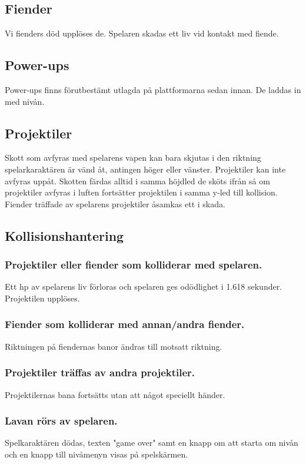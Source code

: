 \documentclass{TDP005mall}
\begin{document}
\subsection{Fiender}
Vi fienders död upplöses de. Spelaren skadas ett liv vid kontakt med fiende.

\subsection{Power-ups}
Power-ups finns förutbestämt utlagda på plattformarna sedan innan. De laddas in med nivån.

\subsection{Projektiler}
Skott som avfyras med spelarens vapen kan bara skjutas i den riktning spelarkaraktären är vänd åt, antingen höger eller vänster. Projektiler kan inte avfyras uppåt. Skotten färdas alltid i samma höjdled de sköts ifrån så om projektiler avfyras i luften fortsätter projektilen i samma y-led till kollision. Fiender träffade av spelarens projektiler åsamkas ett i skada.

\subsection{Kollisionshantering}
\subsubsection{Projektiler eller fiender som kolliderar med spelaren.}
Ett hp av spelarens liv förloras och spelaren ges odödlighet i 1.618 sekunder. Projektilen upplöses.

\subsubsection{Fiender som kolliderar med annan/andra fiender.}
Riktningen på fiendernas banor ändras till motsatt riktning.

\subsubsection{Projektiler träffas av andra projektiler.}
Projektilernas bana fortsätts utan att något speciellt händer.

\subsubsection{Lavan rörs av spelaren.}
Spelkaraktären dödas, texten "game over" samt en knapp om att starta om nivån och en knapp till nivåmenyn visas på spelskärmen.
\end{document}
